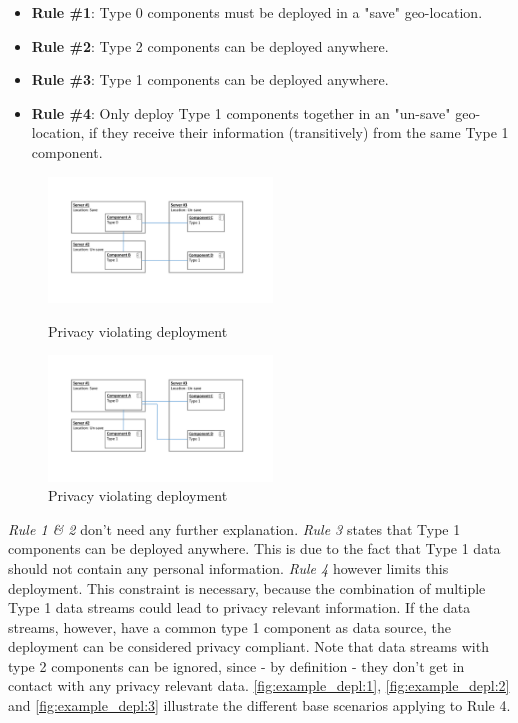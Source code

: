 \begin{itemize}
	\label{enum:deployment_rules}
	\setlength\itemsep{0em}
	\item \textbf{Rule \#1}: Type 0 components must be deployed in a "save" geo-location.
	\item \textbf{Rule \#2}: Type 2 components can be deployed anywhere.
	\item \textbf{Rule \#3}: Type 1 components can be deployed anywhere.
	\item \textbf{Rule \#4}: Only deploy Type 1 components together in an "un-save" geo-location, if they receive their information (transitively) from the same Type 1 component.
\end{itemize}



\begin{figure}
	\begin{center}
		\includegraphics[trim = 35mm 45mm 40mm 30mm, clip, width=0.53\textwidth]{graphs/deployment_example_1}
	\end{center}
	\caption{Privacy violating deployment}
	\label{fig:example_depl:1}
	\begin{center}
		\includegraphics[trim = 35mm 45mm 40mm 30mm, clip, width=0.53\textwidth]{graphs/deployment_example_2}
	\end{center}
	\caption{Privacy violating deployment}
	\label{fig:example_depl:2}
\end{figure}

\textit{Rule 1 \& 2} don’t need any further explanation. \textit{Rule 3} states that Type 1 components can be deployed anywhere. This is due to the fact that Type 1 data should not contain any personal information. \textit{Rule 4} however limits this deployment. This constraint is necessary, because the combination of multiple Type 1 data streams could lead to privacy relevant information. If the data streams, however, have a common type 1 component as data source, the deployment can be considered privacy compliant. Note that data streams with type 2 components can be ignored, since - by definition - they don't get in contact with any privacy relevant data. \autoref{fig:example_depl:1}, \autoref{fig:example_depl:2} and \autoref{fig:example_depl:3} illustrate the different base scenarios applying to Rule 4. 

